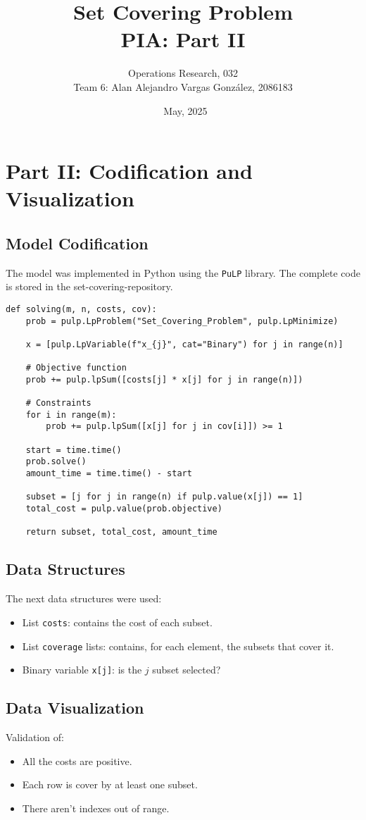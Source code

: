 \documentclass[12pt]{article}
\title{Set Covering Problem\\\large PIA: Part II}
\author{Operations Research, 032\\\large Team 6: Alan Alejandro Vargas González, 2086183}
\date{\ May, 2025}
\begin{document}
\maketitle

\section{Part II: Codification and Visualization}

\subsection{Model Codification}
The model was implemented in Python using the \texttt{PuLP} library. The complete code is stored in the set-covering-repository. 

\begin{verbatim}
def solving(m, n, costs, cov):
    prob = pulp.LpProblem("Set_Covering_Problem", pulp.LpMinimize)

    x = [pulp.LpVariable(f"x_{j}", cat="Binary") for j in range(n)]

    # Objective function
    prob += pulp.lpSum([costs[j] * x[j] for j in range(n)])

    # Constraints
    for i in range(m):
        prob += pulp.lpSum([x[j] for j in cov[i]]) >= 1

    start = time.time()
    prob.solve()
    amount_time = time.time() - start

    subset = [j for j in range(n) if pulp.value(x[j]) == 1]
    total_cost = pulp.value(prob.objective)

    return subset, total_cost, amount_time
\end{verbatim}

\subsection{Data Structures}
The next data structures were used:
\begin{itemize}
    \item List \texttt{costs}: contains the cost of each subset.
    \item List \texttt{coverage} lists: contains, for each element, the subsets that cover it.
    \item Binary variable \texttt{x[j]}: is the \( j \) subset selected?
\end{itemize}

\subsection{Data Visualization}
Validation of:
\begin{itemize}
    \item All the costs are positive.
    \item Each row is cover by at least one subset.
    \item There aren't indexes out of range.
\end{itemize}
\end{document}
